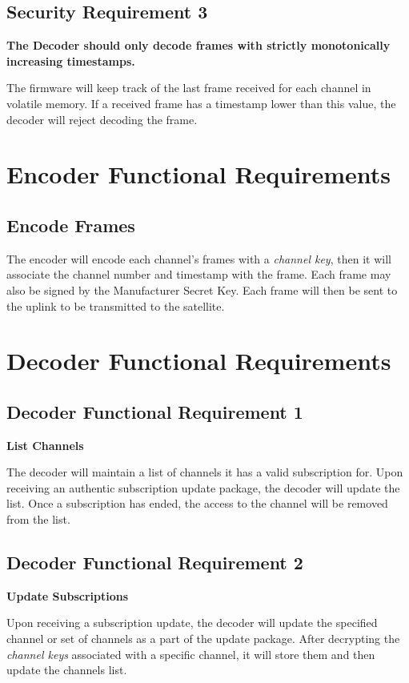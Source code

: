 \documentclass[12pt]{article}
\begin{document}
\subsection*{Security Requirement 3}
\textbf{The Decoder should only decode frames with strictly monotonically increasing timestamps.}

The firmware will keep track of the last frame received for each channel in volatile memory. If a received frame has a timestamp lower than this value, the decoder will reject decoding the frame.

\newpage
\section*{Encoder Functional Requirements}

\subsection*{Encode Frames}
The encoder will encode each channel's frames with a \textit{channel key}, then it will associate the channel number and timestamp with the frame. Each frame may also be signed by the Manufacturer Secret Key. Each frame will then be sent to the uplink to be transmitted to the satellite.

\section*{Decoder Functional Requirements}

\subsection*{Decoder Functional Requirement 1}
\textbf{List Channels}

The decoder will maintain a list of channels it has a valid subscription for. Upon receiving an authentic subscription update package, the decoder will update the list. Once a subscription has ended, the access to the channel will be removed from the list.

\subsection*{Decoder Functional Requirement 2}
\textbf{Update Subscriptions}

Upon receiving a subscription update, the decoder will update the specified channel or set of channels as a part of the update package. After decrypting the \textit{channel keys} associated with a specific channel, it will store them and then update the channels list.
\end{document}
